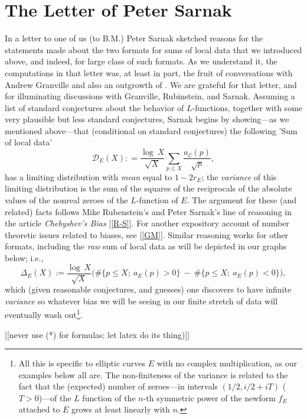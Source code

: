 \documentclass[11pt]{article}
\theoremstyle{plain}
\theoremstyle{definition}
\numberwithin{equation}{section}
\numberwithin{figure}{section}
\numberwithin{table}{section}
\begin{document}
\section{The Letter of Peter Sarnak}  In a letter  \cite{S}  to one of us (to B.M.) Peter Sarnak sketched reasons for the statements made about the two formats for sums of local data that we  introduced above, and indeed, for large class of such formats. As we  understand it, the computations in that letter was, at least in part, the fruit of conversations with Andrew Granville and also an outgrowth of \cite{R-S}. We are grateful for that letter, and for  illuminating discussions with    Granville, Rubinstein, and Sarnak.  Assuming a list of standard conjectures about the behavior of $L$-functions, together with some very plausible but less standard conjectures, Sarnak begins by showing---as we mentioned above---that (conditional on standard conjectures)  the following  'Sum of local data'   $$ {\mathcal D}_E(X): = {\frac{\log\ X}{\sqrt X}}\sum_{p \le X}{\frac{a_{\mathcal E}(p)}{\sqrt p}},$$ has a limiting distribution with {\it mean} equal to $1- 2r_E$; the {\it variance} of this limiting distribution  is the sum of the squares of the reciprocals of the absolute values of the nonreal zeroes of the $L$-function of $E$. The argument for these (and related) facts follows Mike Rubenstein's and Peter Sarnak's line of reasoning in the article {\it Chebyshev's Bias} [\ref{R-S}]. For another expository account of number theoretic issues related to biases, see [\ref{GM}]. Similar reasoning works for other formats, including the {\it raw} sum of local data as will be depicted in our graphs below; i.e.,  $$\Delta_E(X):= {\frac{\log\ X}{\sqrt X}}\big(\#\{ {p \le X};\ a_E(p) > 0\} \ - \ \#\{ {p \le X};\ a_E(p) < 0\}\big),$$ which  (given reasonable conjectures, and guesses)  one discovers to have infinite {\it variance} so whatever bias we will be seeing in our finite stretch of data will eventually wash out{\footnote{ All this is specific to elliptic curves $E$ with no complex multiplication, as our examples below all are. The non-finiteness of the variance is related to the fact that the (expected) number of  zeroes---in  intervals  $(1/2, i/2+iT)$ ($T > 0$)---of the $L$ function of the $n$-th symmetric power of the newform $f_E$ attached to  $E$   grows at least linearly with $n$.}}.





     [[never use (*) for formulas; let latex do its thing)]]
\end{document}
